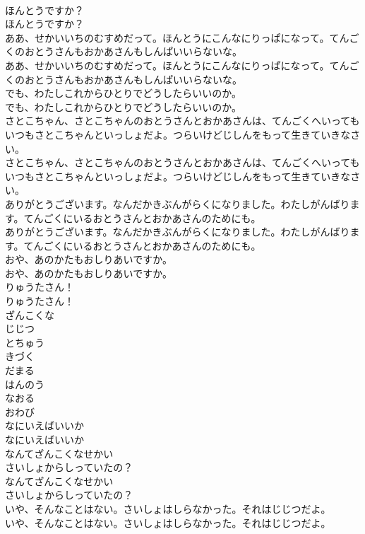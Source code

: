 \documentclass[8pt]{extreport}
\begin{document}
\begin{CJK}{UTF8}{min}
\\	ほんとうですか？
\\	ほんとうですか？
\\	ああ、せかいいちのむすめだって。ほんとうにこんなにりっぱになって。てんごくのおとうさんもおかあさんもしんぱいいらないな。
\\	ああ、せかいいちのむすめだって。ほんとうにこんなにりっぱになって。てんごくのおとうさんもおかあさんもしんぱいいらないな。
\\	でも、わたしこれからひとりでどうしたらいいのか。
\\	でも、わたしこれからひとりでどうしたらいいのか。
\\	さとこちゃん、さとこちゃんのおとうさんとおかあさんは、てんごくへいってもいつもさとこちゃんといっしょだよ。つらいけどじしんをもって生きていきなさい。
\\	さとこちゃん、さとこちゃんのおとうさんとおかあさんは、てんごくへいってもいつもさとこちゃんといっしょだよ。つらいけどじしんをもって生きていきなさい。
\\	ありがとうございます。なんだかきぶんがらくになりました。わたしがんばります。てんごくにいるおとうさんとおかあさんのためにも。
\\	ありがとうございます。なんだかきぶんがらくになりました。わたしがんばります。てんごくにいるおとうさんとおかあさんのためにも。
\\	おや、あのかたもおしりあいですか。
\\	おや、あのかたもおしりあいですか。
\\	りゅうたさん！
\\	りゅうたさん！
\\	ざんこくな
\\	じじつ
\\	とちゅう
\\	きづく
\\	だまる
\\	はんのう
\\	なおる
\\	おわび
\\	なにいえばいいか
\\	なにいえばいいか
\\	なんてざんこくなせかい
\\	さいしょからしっていたの？
\\	なんてざんこくなせかい
\\	さいしょからしっていたの？
\\	いや、そんなことはない。さいしょはしらなかった。それはじじつだよ。
\\	いや、そんなことはない。さいしょはしらなかった。それはじじつだよ。

\end{CJK}
\end{document}

